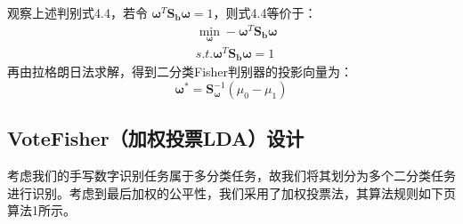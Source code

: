 \documentclass[UTF8, a4paper, 12pt]{report}
\begin{document}
			观察上述判别式4.4，若令 $\bm{\omega}^T \bm{S}_{\bm{b}} \bm{\omega}=1$，则式4.4等价于：
			\begin{equation}
			\begin{aligned}
				&\min_{\bm{\omega}} -\bm{\omega}^T \bm{S}_{\bm{b}} \bm{\omega}\\
				&s.t. \bm{\omega}^T \bm{S}_{\bm{b}} \bm{\omega}=1
			\end{aligned}
			\end{equation}
再由拉格朗日法求解，得到二分类Fisher判别器的投影向量为：
			\begin{equation}
				\bm{\omega} ^* = \bm{S} _{\bm{\omega}}^{-1} (\mu_0-\mu_1)
			\end{equation}

		\subsection{VoteFisher（加权投票LDA）设计}
			考虑我们的手写数字识别任务属于多分类任务，故我们将其划分为多个二分类任务进行识别。考虑到最后加权的公平性，我们采用了加权投票法，其算法规则如下页算法1所示。
\end{document}

